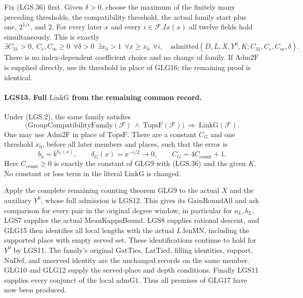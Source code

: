 \documentclass[11pt,a4paper]{article}
\numberwithin{equation}{section}
\theoremstyle{remark}\newtheorem{remark}[theorem]{Remark}
\begin{document}
Fix (LGS.36) first.  Given \(\delta>0\), choose the
maximum of the finitely many preceding thresholds,
the compatibility threshold, the actual family start
plus one, \(2^{1/\epsilon}\), and \(2\).
For every later \(x\) and every \(i\in\mathcal F.Ix(x)\)
all twelve fields hold simultaneously.  This is
exactly
\[
 \exists C_{31}>0,\ C_e,C_m\ge0\
 \ \forall\delta>0\
 \ \exists x_0>1\
 \ \forall x\ge x_0\
 \ \forall i,\quad
             \mathrm{admitted}(D,L,X,Y^0,K;
                                      C_{31},C_e,C_m,\delta).
                                                               \tag{LGS.37}
\]
There is no index-dependent coefficient choice and
no change of family.  If \(\mathrm{Adm2F}\) is supplied
directly, use its threshold in place of GLG16; the
remaining proof is identical.

\paragraph{LGS13. Full \(\mathrm{LinkG}\) from the remaining common record.}
\label{claim:LGS13}
Under (LGS.2), the same family satisfies
\[
 \bigl(\mathrm{GroupCompatibilityFamily}(\mathcal F)
       \ \wedge\ \mathrm{TopsF}(\mathcal F)\bigr)
               \ \Longrightarrow\ \mathrm{LinkG}(\mathcal F).
                                                               \tag{LGS.38}
\]
One may use \(\mathrm{Adm2F}\) in place of
\(\mathrm{TopsF}\).  There are a constant \(C_G\) and
one threshold \(x_0\), before all later members and
places, such that the error is
\[
           b_o=b^{\delta_G(x)},\qquad
           \delta_G(x)=x^{-\epsilon/2}\longrightarrow0,
           \qquad C_G=4C_{\mathrm{count}}+1.          \tag{LGS.39}
\]
Here \(C_{\mathrm{count}}\ge0\) is exactly the
constant of GLG9 with (LGS.36) and the given \(K\).
No constant or loss term in the literal \(\mathrm{LinkG}\)
is changed.

Apply the complete remaining counting theorem GLG9
to the actual \(X\) and the auxiliary \(Y^0\), whose
full admission is LGS12.  This gives its
\(\mathrm{GainBoundAll}\) and ask comparison for
every pair in the original degree window, in
particular for \(a_L,b_L\).
LGS7 supplies the actual \(\mathrm{MeanKappaBound}\).
LGS8 supplies rational descent, and GLG15 then
identifies all local lengths with the actual
\(L.\mathrm{lenMN}\), including the supported place
with empty served set.  These identifications
continue to hold for \(Y^0\) by LGS11.
The family's original \(\mathrm{GatTies}\),
\(\mathrm{LatTied}\), filling identities, support,
\(\mathrm{NuDef}\), and unserved identity are the
unchanged records on the same member.
GLG10 and GLG12 supply the served-place and depth
conditions.  Finally LGS11 supplies every conjunct
of the local \(\mathrm{admG1}\).
Thus all premises of GLG17 have now been produced.
\end{document}

